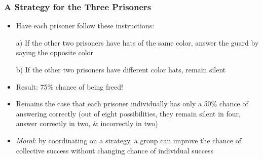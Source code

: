 \begin{frame}
\frametitle{A Strategy for the Three Prisoners}

\begin{itemize}[<+->]

\item Have each prisoner follow these instructions:

\item[a)] If the other two prisoners have hats of the same color, answer the guard by saying the opposite color

\item[b)] If the other two prisoners have different color hats, remain silent

\item Result: 75\% chance of being freed! 

\item Remains the case that each prisoner individually has only a 50\% chance of answering correctly (out of eight possibilities, they remain silent in four, answer correctly in two, \& incorrectly in two)

\item \emph{Moral}: by coordinating on a strategy, a group can improve the chance of collective success without changing chance of individual success

\end{itemize}
\end{frame}

